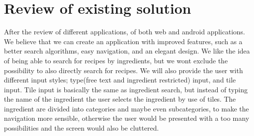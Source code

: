 \section{Review of existing solution}
 After the review of different applications, of both web and android applications. We believe that we can create an application with improved features, such as a better search algorithms, easy navigation, and an elegant design. We like the idea of being able to search for recipes by ingredients, but we wont exclude the possibility to also directly search for recipes. We will also provide the user with different input styles; type(free text and ingredient restricted) input, and tile input. Tile input is basically the same as ingredient search, but instead of typing the name of the ingredient the user selects the ingredient by use of tiles. The ingredient are divided into categories and maybe even subcategories, to make the navigation more sensible, otherwise the user would be presented with a too many possibilities and the screen would also be cluttered.  
